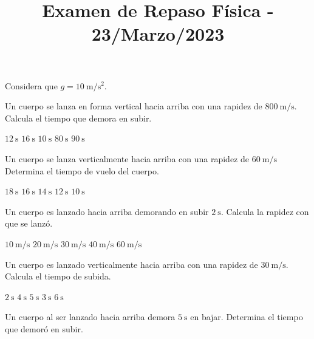\documentclass[14pt]{exam}
\title{\vspace*{-2.5cm}\large{Examen de Repaso Física - 23/Marzo/2023 \vspace{-8ex}}}
\date{}
\begin{document}
\maketitle

Considera que $g = \SI{10}{\meter\per\square\second}$.

\begin{questions}
    \question Un cuerpo se lanza en forma vertical hacia arriba con una rapidez de $\SI{800}{\meter\per\second}$. Calcula el tiempo que demora en subir.
    \\[0.5em]
    \begin{oneparchoices}
        \choice $\SI{12}{\second}$
        \choice $\SI{16}{\second}$
        \choice $\SI{10}{\second}$
        \choice $\SI{80}{\second}$
        \choice $\SI{90}{\second}$
    \end{oneparchoices}
    \question Un cuerpo se lanza verticalmente hacia arriba con una rapidez de $\SI{60}{\meter\per\second}$ Determina el tiempo de vuelo del cuerpo. 
    \\[0.5em]
    \begin{oneparchoices}
        \choice $\SI{18}{\second}$
        \choice $\SI{16}{\second}$
        \choice $\SI{14}{\second}$
        \choice $\SI{12}{\second}$
        \choice $\SI{10}{\second}$
    \end{oneparchoices}
    \question Un cuerpo es lanzado hacia arriba demorando en subir $\SI{2}{\second}$. Calcula la rapidez con que se lanzó.
    \\[0.5em]
    \begin{oneparchoices}
        \choice $\SI{10}{\meter\per\second}$
        \choice $\SI{20}{\meter\per\second}$
        \choice $\SI{30}{\meter\per\second}$
        \choice $\SI{40}{\meter\per\second}$
        \choice $\SI{60}{\meter\per\second}$
    \end{oneparchoices}
    \question Un cuerpo es lanzado verticalmente hacia arriba con una rapidez de $\SI{30}{\meter\per\second}$. Calcula el tiempo de subida.
    \\[0.5em]
    \begin{oneparchoices}
        \choice $\SI{2}{\second}$
        \choice $\SI{4}{\second}$
        \choice $\SI{5}{\second}$
        \choice $\SI{3}{\second}$
        \choice $\SI{6}{\second}$
    \end{oneparchoices}
    \question Un cuerpo al ser lanzado hacia arriba demora $\SI{5}{\second}$ en bajar. Determina el tiempo que demoró en subir.
    \\[0.5em]

\end{questions}
\end{document}
